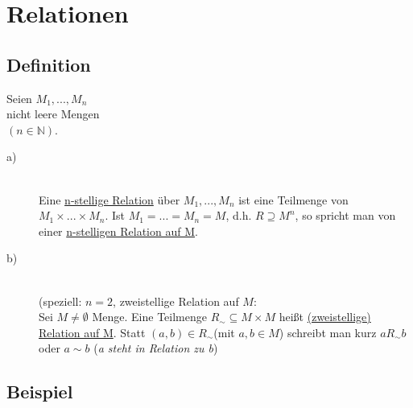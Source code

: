 \documentclass[a4paper, 12pt, twoside] {article}
\begin{document}
\section{Relationen}

\subsection{Definition}
Seien $M_1, ..., M_n$ \\
nicht leere Mengen \\
$(n \in \mathbb{N})$.

\begin{description}

\item[a)] \hfill \\
Eine \underline{n-stellige Relation} über $M_1, ..., M_n$ ist eine Teilmenge von $M_1 \times ... \times M_n$.
Ist $M_1 = ... = M_n = M$, d.h. $R \supseteq M^n$,
so spricht man von einer \underline{n-stelligen Relation auf M}.

\item[b)]  \hfill \\
(speziell: $n = 2$, zweistellige Relation auf $M$: \\
Sei $M \neq \emptyset$ Menge. Eine Teilmenge $R_{\sim} \subseteq M \times M$ heißt \underline{(zweistellige) Relation auf M}. Statt $(a, b) \in R_{\sim} $(mit $a, b \in M$) schreibt man kurz $a R_{\sim} b$ oder $a \sim b$ (\textit{a steht in Relation zu b})

\end{description}

\subsection{Beispiel}
\end{document}
